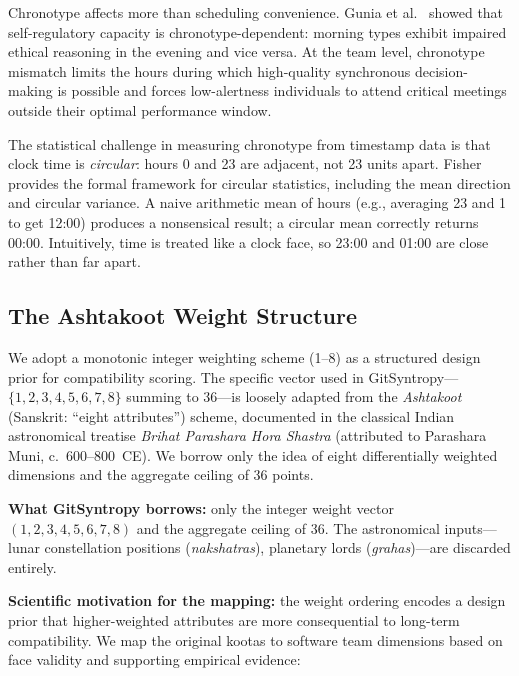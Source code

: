 \documentclass[conference]{IEEEtran}
\begin{document}
Chronotype affects more than scheduling convenience.  Gunia et
al.~\cite{gunia2014} showed that self-regulatory capacity is
chronotype-dependent: morning types exhibit impaired ethical
reasoning in the evening and vice versa.  At the team level,
chronotype mismatch limits the hours during which high-quality
synchronous decision-making is possible and forces low-alertness
individuals to attend critical meetings outside their optimal
performance window.

The statistical challenge in measuring chronotype from timestamp
data is that clock time is \textit{circular}: hours 0 and 23 are
adjacent, not 23 units apart.  Fisher~\cite{fisher1993} provides the
formal framework for circular statistics, including the mean direction
and circular variance.  A naive arithmetic mean of hours (e.g.,
averaging 23 and 1 to get 12:00) produces a nonsensical result;
a circular mean correctly returns 00:00.
Intuitively, time is treated like a clock face, so 23:00 and 01:00
are close rather than far apart.

\subsection{The Ashtakoot Weight Structure}

We adopt a monotonic integer weighting scheme (1--8) as a structured
design prior for compatibility scoring.  The specific vector used in
GitSyntropy---$\{1,2,3,4,5,6,7,8\}$ summing to 36---is loosely adapted
from the \textit{Ashtakoot} (Sanskrit: ``eight attributes'') scheme,
documented in the classical Indian astronomical treatise
\textit{Brihat Parashara Hora Shastra} (attributed to Parashara Muni,
c.\ 600--800~CE).  We borrow only the idea of eight differentially
weighted dimensions and the aggregate ceiling of 36 points.

\textbf{What GitSyntropy borrows:} only the integer weight vector
$(1,2,3,4,5,6,7,8)$ and the aggregate ceiling of 36.  The
astronomical inputs---lunar constellation positions (\textit{nakshatras}),
planetary lords (\textit{grahas})---are discarded entirely.

\textbf{Scientific motivation for the mapping:} the weight ordering
encodes a design prior that higher-weighted attributes are more
consequential to long-term compatibility.  We map the original
kootas to software team dimensions based on face validity and
supporting empirical evidence:
\end{document}
